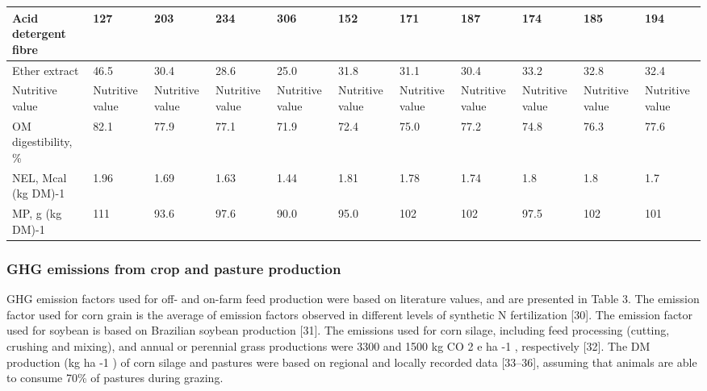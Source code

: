 \documentclass[11pt,a4paper]{article}
\begin{document}
\begin{table}[h]
\begin{tabular}{|l|l|l|l|l|l|l|l|l|l|l|}
Acid detergent fibre & 127 & 203 & 234 & 306 & 152 & 171 & 187 & 174 & 185 & 194 \\ \hline
Ether extract & 46.5 & 30.4 & 28.6 & 25.0 & 31.8 & 31.1 & 30.4 & 33.2 & 32.8 & 32.4 \\ \hline
Nutritive value & Nutritive value & Nutritive value & Nutritive value & Nutritive value & Nutritive value & Nutritive value & Nutritive value & Nutritive value & Nutritive value & Nutritive value \\ \hline
OM digestibility, \% & 82.1 & 77.9 & 77.1 & 71.9 & 72.4 & 75.0 & 77.2 & 74.8 & 76.3 & 77.6 \\ \hline
NEL, Mcal (kg DM)-1 & 1.96 & 1.69 & 1.63 & 1.44 & 1.81 & 1.78 & 1.74 & 1.8 & 1.8 & 1.7 \\ \hline
MP, g (kg DM)-1 & 111 & 93.6 & 97.6 & 90.0 & 95.0 & 102 & 102 & 97.5 & 102 & 101 \\ \hline
\end{tabular}
\end{table}

\subsubsection{GHG emissions from crop and pasture production}

GHG emission factors used for off- and on-farm feed production were based on literature values, and are presented in Table 3. The emission factor used for corn grain is the average of emission factors observed in different levels of synthetic N fertilization [30]. The emission factor used for soybean is based on Brazilian soybean production [31]. The emissions used for corn silage, including feed processing (cutting, crushing and mixing), and annual or perennial grass productions were 3300 and 1500 kg CO 2 e ha -1 , respectively [32]. The DM production (kg ha -1 ) of corn silage and pastures were based on regional and locally recorded data [33–36], assuming that animals are able to consume 70\% of pastures during grazing.
\end{document}
